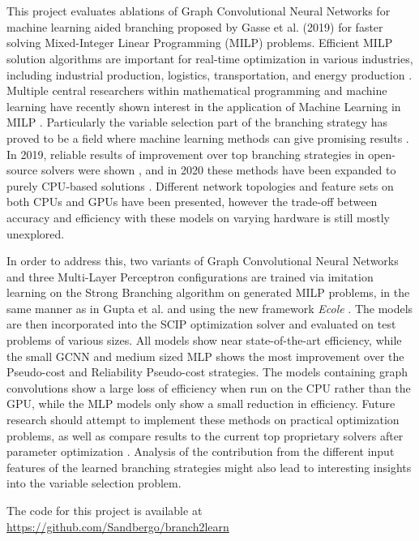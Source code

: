 \chapter*{\englishabstractname}
%
This project evaluates ablations of Graph Convolutional Neural Networks for machine learning aided branching proposed by Gasse et al. (2019) \cite{gasse2019exact}
for faster solving Mixed-Integer Linear Programming (\gls{MILP}) problems. 
Efficient \gls{MILP} solution algorithms are important for real-time optimization in various industries, including industrial production, logistics, transportation, and energy production \cite{junger2010years}.  %
Multiple central researchers within mathematical programming and machine learning have recently shown interest in the application of Machine Learning in \gls{MILP} \cite{bengio2020machine,bertsimas2019online}. Particularly the variable selection part of the branching strategy has proved to be a field where machine learning methods can give promising results \cite{khalil2020towards}.
In 2019, reliable results of improvement over top branching strategies in open-source solvers were shown \cite{gasse2019exact}, and in 2020 these methods have been expanded to purely \gls{CPU}-based solutions \cite{gupta2020hybrid}. Different network topologies and feature sets on both \gls{CPU}s and \gls{GPU}s have been presented, however the trade-off between accuracy and efficiency with these models on varying hardware is still mostly unexplored.

In order to address this, two variants of Graph Convolutional Neural Networks and three Multi-Layer Perceptron configurations are trained via imitation learning on the Strong Branching algorithm on generated \gls{MILP} problems, in the same manner as in Gupta et al. \cite{gupta2020hybrid} and using the new framework \textit{Ecole} \cite{prouvost2020ecole,prouvost2021ecole}.  The models are then incorporated into the \gls{SCIP} optimization solver and evaluated on test problems of various sizes. All models show near state-of-the-art efficiency, while the small \gls{GCNN} and medium sized \gls{MLP} shows the most improvement over the Pseudo-cost and Reliability Pseudo-cost strategies. The models containing graph convolutions show a large loss of efficiency when run on the \gls{CPU} rather than the \gls{GPU}, while the \gls{MLP} models only show a small reduction in efficiency.
Future research should attempt to implement these methods on practical optimization problems, as well as compare results to the current top proprietary solvers after parameter optimization \cite{hutter2010automated}. Analysis of the contribution from the different input features of the learned branching strategies might also lead to interesting insights into the variable selection problem. 

The code for this project is available at\\ \url{https://github.com/Sandbergo/branch2learn}
%
\clearpage
